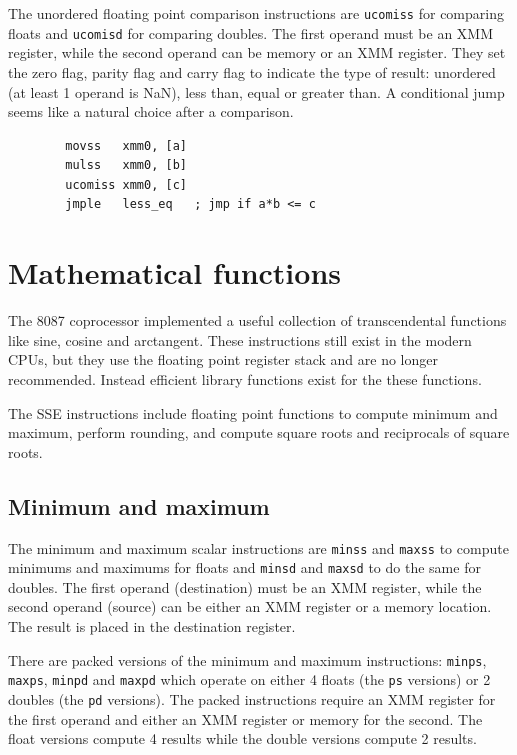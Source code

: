 \documentclass[11pt,b5paper]{book}
\begin{document}
The unordered floating point comparison instructions are {\tt ucomiss} for comparing floats
and {\tt ucomisd} for comparing doubles.
The first operand must be an XMM register, while the second operand can be memory or an XMM register.
They set the zero flag, parity flag and carry flag to indicate the type of result: unordered
(at least 1 operand is NaN), less than, equal or greater than.
A conditional jump seems like a natural choice after a comparison.


\begin{verbatim}
        movss   xmm0, [a]
        mulss   xmm0, [b]
        ucomiss xmm0, [c]
        jmple   less_eq   ; jmp if a*b <= c
\end{verbatim}

\section{Mathematical functions}

The 8087 coprocessor implemented a useful collection of transcendental functions like
sine, cosine and arctangent.
These instructions still exist in the modern CPUs, but they use the floating point register stack and
are no longer recommended.
Instead efficient library functions exist for the these functions.

The SSE instructions include floating point functions to compute minimum and maximum, perform rounding,
and compute square roots and reciprocals of square roots.

\subsection{Minimum and maximum}

The minimum and maximum scalar instructions are {\tt minss} and {\tt maxss} to compute minimums and
maximums for floats and {\tt minsd} and {\tt maxsd} to do the same for doubles.
The first operand (destination) must be an XMM register, while the second operand (source) can be either
an XMM register or a memory location.
The result is placed in the destination register.

There are packed versions of the minimum and maximum instructions:
{\tt minps}, {\tt maxps}, {\tt minpd} and {\tt maxpd} which operate on either 4 floats (the {\tt ps} versions)
or 2 doubles (the {\tt pd} versions).
The packed instructions require an XMM register for the first operand and either an XMM register or memory
for the second.
The float versions compute 4 results while the double versions compute 2 results.
\end{document}
